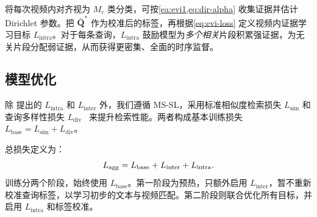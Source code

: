 将每次视频内对齐视为 $M_c$ 类分类，可按\cref{ea:evi1,eq:dir-alpha} 收集证据并估计 Dirichlet 参数。把 $ {{\bar{\mathbf{Q}}}^*}$ 作为校准后的标签，再根据\cref{eq:evi-loss} 定义视频内证据学习目标 $L_{\mathrm{intra}}$。对于每条查询，$L_{\mathrm{intra}}$ 鼓励模型为\emph{多个相关}片段积累强证据，为无关片段分配弱证据，从而获得更密集、全面的时序监督。

\subsection{模型优化}
除 \modelname{} 提出的 $L_{\mathrm{intra}}$ 和 $L_{\mathrm{inter}}$ 外，我们遵循 MS-SL\cite{ms-sl}，采用标准相似度检索损失 $L_{\mathrm{sim}}$ 和查询多样性损失 $L_{\mathrm{div}}$~\cite{GMMFORMER} 来提升检索性能。两者构成基本训练损失 $L_{\mathrm{base}} = L_{\mathrm{sim}} + L_{\mathrm{div}}$。

总损失定义为：
\vspace{-.4em}
\begin{equation}
L_{\mathrm{agg}} = L_{\mathrm{base}} + L_{\mathrm{inter}} + L_{\mathrm{intra}}.
\vspace{-.4em}
\end{equation}
训练分两个阶段，始终使用 $L_{\mathrm{base}}$。第一阶段为预热，只额外启用 $L_{\mathrm{inter}}$，暂不重新校准查询标签，以学习初步的文本与视频匹配。第二阶段则联合优化所有目标，并启用 $L_{\mathrm{intra}}$ 和标签校准。
